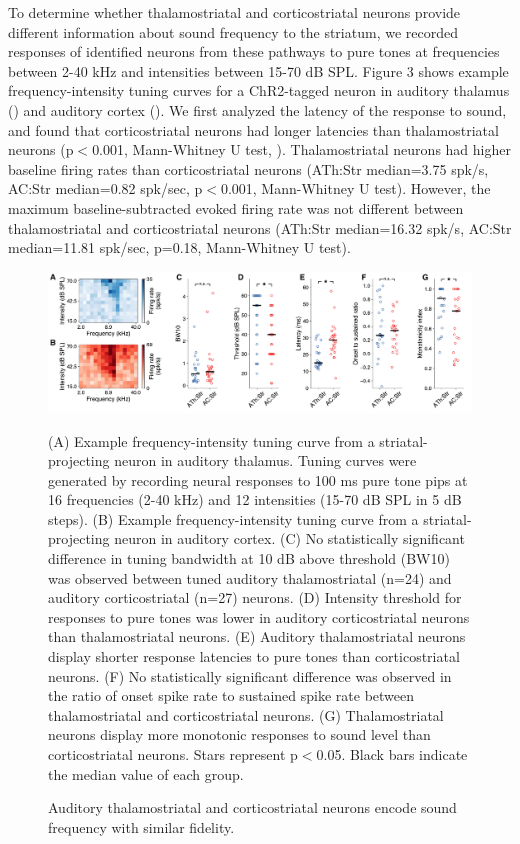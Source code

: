 To determine whether thalamostriatal and corticostriatal neurons provide different information about sound frequency to the striatum, we recorded responses of identified neurons from these pathways to pure tones at frequencies between 2-40 kHz and intensities between 15-70 dB SPL. 
%
Figure 3 shows example frequency-intensity tuning curves for a ChR2-tagged neuron in auditory thalamus (\fig{\FrequencyThalExample}) and auditory cortex (\fig{\FrequencyACExample}).
%
We first analyzed the latency of the response to sound, and found that corticostriatal neurons had longer latencies than thalamostriatal neurons (p$<$0.001, Mann-Whitney U test, \fig{\FrequencyLatency}). 
%
Thalamostriatal neurons had higher baseline firing rates than corticostriatal neurons (ATh:Str median=3.75 spk/s, AC:Str median=0.82 spk/sec, p$<$0.001, Mann-Whitney U test). 
%
However, the maximum baseline-subtracted evoked firing rate was not different between thalamostriatal and corticostriatal neurons (ATh:Str median=16.32 spk/s, AC:Str median=11.81 spk/sec, p=0.18, Mann-Whitney U test). 

\begin{figure}[hp]
  \begin{center}
    \includegraphics[width=6in]{figures/chapter3/fig4_frequency}%
  \end{center}
\caption{Auditory thalamostriatal and corticostriatal neurons encode sound frequency with similar fidelity.}{(A) Example frequency-intensity tuning curve from a striatal-projecting neuron in auditory thalamus.
%
Tuning curves were generated by recording neural responses to 100 ms pure tone pips at 16 frequencies (2-40 kHz) and 12 intensities (15-70 dB SPL in 5 dB steps). 
%
(B) Example frequency-intensity tuning curve from a striatal-projecting neuron in auditory cortex. 
%
(C) No statistically significant difference in tuning bandwidth at 10 dB above threshold (BW10) was observed between tuned auditory thalamostriatal (n=24) and auditory corticostriatal (n=27) neurons. 
%
(D) Intensity threshold for responses to pure tones was lower in auditory corticostriatal neurons than thalamostriatal neurons. 
%
(E) Auditory thalamostriatal neurons display shorter response latencies to pure tones than corticostriatal neurons. 
%
(F) No statistically significant difference was observed in the ratio of onset spike rate to sustained spike rate between thalamostriatal and corticostriatal neurons.
%
(G) Thalamostriatal neurons display more monotonic responses to sound level than corticostriatal neurons.
%
Stars represent p$<$0.05. Black bars indicate the median value of each group.
}
\end{figure}

